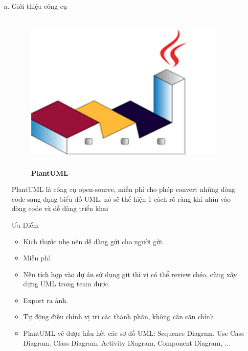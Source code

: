 \begin{enumerate}[a)]



  \item  Giới thiệu công cụ


\begin{figure}[H]
  \centering
  \includegraphics[width=10cm,height=8cm]{Images/appendix/plantuml.png}
  \caption[PlantUML]{\bfseries \fontsize{12pt}{0pt}
  \selectfont PlantUML}
  \label{plantuml} %
\end{figure}


PlantUML là công cụ open-source, miễn phí cho phép convert những dòng code sang dạng biểu đồ UML, nó sẽ thể hiện 1 cách rõ ràng khi nhìn vào dòng code và dễ dàng triển khai


Ưu Điểm
\begin{adjustwidth}{1.5em}{}
  \begin{itemize}
      \item Kích thước nhẹ nên dễ dàng gửi cho người gửi.
  
      \item 	Miễn phí
      \item 	Nếu tích hợp vào dự án sử dụng git thì vì có thể review chéo, cùng xây dựng UML trong team được.
      \item 	Export ra ảnh.
      \item 	Tự động điều chỉnh vị trí các thành phần, không cần căn chỉnh
      \item 	PlantUML vẽ được hầu hết các sơ đồ UML: Sequence Diagram, Use Case Diagram, Class Diagram, Activity Diagram, Component Diagram, ...
      
  \end{itemize}
\end{adjustwidth}





\end{enumerate}
